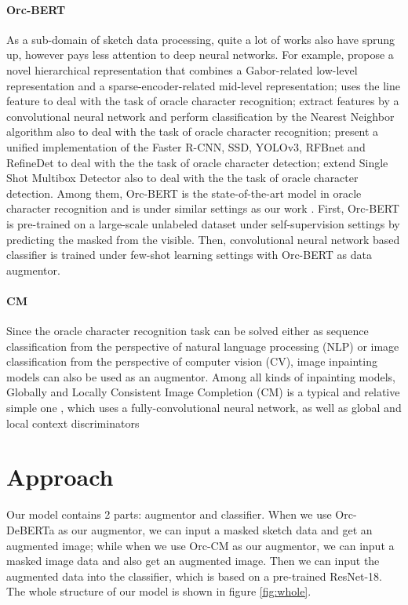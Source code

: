 \documentclass{article}
\begin{document}
\paragraph{Orc-BERT}
As a sub-domain of sketch data processing, quite a lot of works also have sprung up, however pays less attention to deep neural networks. For example, \cite{Hierachical} propose a novel hierarchical representation that combines a Gabor-related low-level representation and a sparse-encoder-related mid-level representation; \citep{Line} uses the line feature to deal with the task of oracle character recognition; \citep{Neighbor} extract features by a convolutional neural network and perform classification by the Nearest Neighbor algorithm also to deal with the task of oracle character recognition; \citep{Detection} present a unified implementation of the Faster R-CNN, SSD, YOLOv3, RFBnet and RefineDet to deal with the the task of oracle character detection; \citep{SSD} extend Single Shot Multibox Detector also to deal with the the task of oracle character detection. Among them, Orc-BERT is the state-of-the-art model in oracle character recognition and is under similar settings as our work \citep{Orc-BERT}.
First, Orc-BERT is pre-trained on a large-scale unlabeled dataset under self-supervision settings by predicting the masked from the visible. Then, convolutional neural network based classifier is trained under few-shot learning settings with Orc-BERT as data augmentor.

\paragraph{CM}
Since the oracle character recognition task can be solved either as sequence classification from the perspective of natural language processing (NLP) or image classification from the perspective of computer vision (CV), image inpainting models can also be used as an augmentor. Among all kinds of inpainting models, Globally and Locally Consistent Image Completion (CM) is a typical and relative simple one \citep{CM}, which uses a fully-convolutional neural network, as well as global and local context discriminators 

\section{Approach}

Our model contains 2 parts: augmentor and classifier. When we use Orc-DeBERTa as our augmentor, we can input a masked sketch data and get an augmented image; while when we use Orc-CM as our augmentor, we can input a masked image data and also get an augmented image. Then we can input the augmented data into the classifier, which is based on a pre-trained ResNet-18. The whole structure of our model is shown in figure \ref{fig:whole}.
\end{document}
